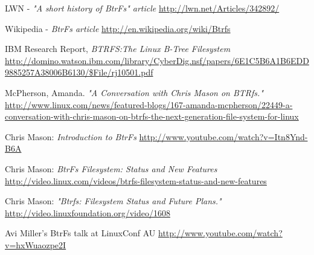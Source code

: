 \documentclass[final]{ols}
\begin{document}
LWN - \textit{"A short history of BtrFs" article} {\small\url{http://lwn.net/Articles/342892/}}

Wikipedia - \textit{BtrFs article} {\small\url{http://en.wikipedia.org/wiki/Btrfs}}

IBM Research Report, \textit{BTRFS:The Linux B-Tree Filesystem} {\small\url{http://domino.watson.ibm.com/library/CyberDig.nsf/papers/6E1C5B6A1B6EDD9885257A38006B6130/\$File/rj10501.pdf}}

McPherson, Amanda. \textit{"A Conversation with Chris Mason on BTRfs."} {\small\url{http://www.linux.com/news/featured-blogs/167-amanda-mcpherson/22449-a-conversation-with-chris-mason-on-btrfs-the-next-generation-file-system-for-linux}}

Chris Mason: \textit{Introduction to BtrFs} {\small\url{http://www.youtube.com/watch?v=Itn8Ynd-B6A}}

Chris Mason: \textit{BtrFs Filesystem: Status and New Features} {\small\url{http://video.linux.com/videos/btrfs-filesystem-status-and-new-features}}

Chris Mason: \textit{"Btrfs: Filesystem Status and Future Plans."} {\small\url{http://video.linuxfoundation.org/video/1608}}

Avi Miller's BtrFs talk at LinuxConf AU {\small\url{http://www.youtube.com/watch?v=hxWuaozpe2I}}

\end{document}
